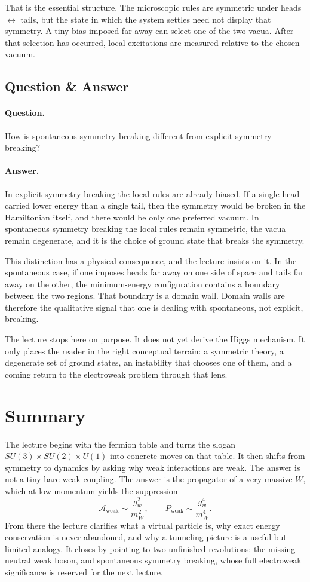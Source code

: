 That is the essential structure. The microscopic rules are symmetric under heads \(\leftrightarrow\) tails, but the state in which the system settles need not display that symmetry. A tiny bias imposed far away can select one of the two vacua. After that selection has occurred, local excitations are measured relative to the chosen vacuum.

\subsection{Question \& Answer}

\paragraph{Question.} How is spontaneous symmetry breaking different from explicit symmetry breaking?

\paragraph{Answer.} In explicit symmetry breaking the local rules are already biased. If a single head carried lower energy than a single tail, then the symmetry would be broken in the Hamiltonian itself, and there would be only one preferred vacuum. In spontaneous symmetry breaking the local rules remain symmetric, the vacua remain degenerate, and it is the choice of ground state that breaks the symmetry.

This distinction has a physical consequence, and the lecture insists on it. In the spontaneous case, if one imposes heads far away on one side of space and tails far away on the other, the minimum-energy configuration contains a boundary between the two regions. That boundary is a domain wall. Domain walls are therefore the qualitative signal that one is dealing with spontaneous, not explicit, breaking.

The lecture stops here on purpose. It does not yet derive the Higgs mechanism. It only places the reader in the right conceptual terrain: a symmetric theory, a degenerate set of ground states, an instability that chooses one of them, and a coming return to the electroweak problem through that lens.

\section{Summary}

The lecture begins with the fermion table and turns the slogan \(SU(3)\times SU(2)\times U(1)\) into concrete moves on that table. It then shifts from symmetry to dynamics by asking why weak interactions are weak. The answer is not a tiny bare weak coupling. The answer is the propagator of a very massive \(W\), which at low momentum yields the suppression
\[
\mathcal{A}_{\text{weak}} \sim \frac{g_w^2}{m_W^2},
\qquad
P_{\text{weak}} \sim \frac{g_w^4}{m_W^4}.
\]
From there the lecture clarifies what a virtual particle is, why exact energy conservation is never abandoned, and why a tunneling picture is a useful but limited analogy. It closes by pointing to two unfinished revolutions: the missing neutral weak boson, and spontaneous symmetry breaking, whose full electroweak significance is reserved for the next lecture.